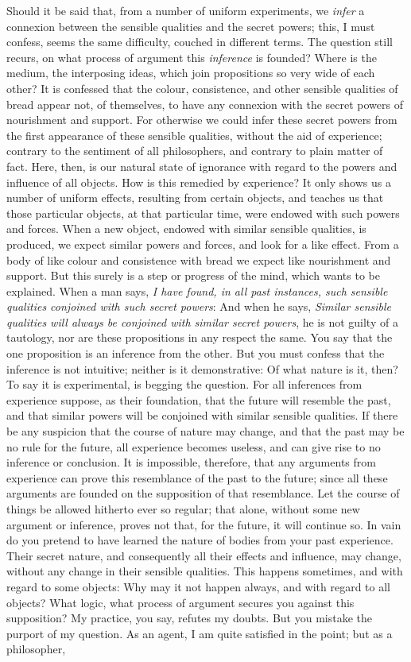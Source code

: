 \documentclass[]{article}
\begin{document}
\begin{sectionbody}
\humeparagraph  Should it be said that, from a number of uniform experiments, we \emph{infer} a connexion between the sensible qualities and the secret powers; this, I must confess, seems the same difficulty, couched in different terms. The question still recurs, on what process of argument this \emph{inference} is founded? Where is the medium, the interposing ideas, which join propositions so very wide of each other? It is confessed that the colour, consistence, and other sensible qualities of bread appear not, of themselves, to have any connexion with the secret powers of nourishment and support. For otherwise we could infer these secret powers from the first appearance of these sensible qualities, without the aid of experience; contrary to the sentiment of all philosophers, and contrary to plain matter of fact. Here, then, is our natural state of ignorance with regard to the powers and influence of all objects. How is this remedied by experience? It only shows us a number of uniform effects, resulting from certain objects, and teaches us that those particular objects, at that particular time, were endowed with such powers and forces. When a new object, endowed with similar sensible qualities, is produced, we expect similar powers and forces, and look for a like effect. From a body of like colour and consistence with bread we expect like nourishment and support. But this surely is a step or progress of the mind, which wants to be explained. When a man says, \emph{I have found, in all past instances, such sensible qualities conjoined with such secret powers}: And when he says, \emph{Similar sensible qualities will always be conjoined with similar secret powers}, he is not guilty of a tautology, nor are these propositions in any respect the same. You say that the one proposition is an inference from the other. But you must confess that the inference is not intuitive; neither is it demonstrative: Of what nature is it, then? To say it is experimental, is begging the question. For all inferences from experience suppose, as their foundation, that the future will resemble the past, and that similar powers will be conjoined with similar sensible qualities. If there be any suspicion that the course of nature may change, and that the past may be no rule for the future, all experience becomes useless, and can give rise to no inference or conclusion. It is impossible, therefore, that any arguments from experience can prove this resemblance of the past to the future; since all these arguments are founded on the supposition of that resemblance. Let the course of things be allowed hitherto ever so regular; that alone, without some new argument or inference, proves not that, for the future, it will continue so. In vain do you pretend to have learned the nature of bodies from your past experience. Their secret nature, and consequently all their effects and influence, may change, without any change in their sensible qualities. This happens sometimes, and with regard to some objects: Why may it not happen always, and with regard to all objects? What logic, what process of argument secures you against this supposition? My practice, you say, refutes my doubts. But you mistake the purport of my question. As an agent, I am quite satisfied in the point; but as a philosopher, 
\end{sectionbody}
\end{document}
